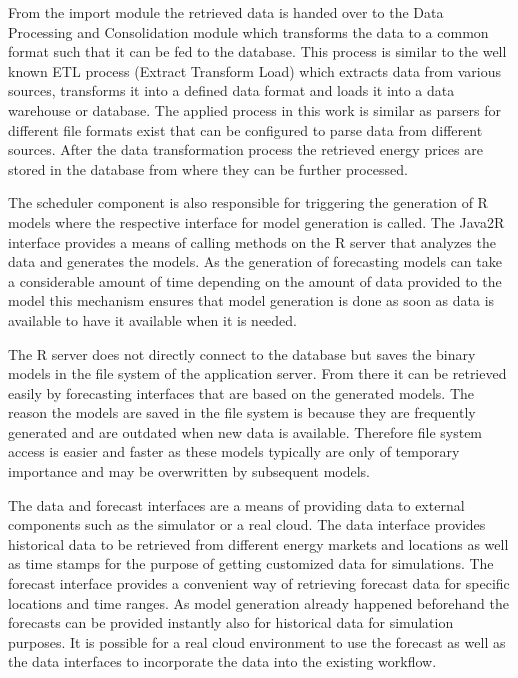 From the import module the retrieved data is handed over to the Data Processing and Consolidation module which transforms the data to a common format such that it can be fed to the database. This process is similar to the well known ETL process (Extract Transform Load) which extracts data from various sources, transforms it into a defined data format and loads it into a data warehouse or database. The applied process in this work is similar as parsers for different file formats exist that can be configured to parse data from different sources. After the data transformation process the retrieved energy prices are stored in the database from where they can be further processed. 

The scheduler component is also responsible for triggering the generation of R models where the respective interface for model generation is called. The Java2R interface provides a means of calling methods on the R server that analyzes the data and generates the models. As the generation of forecasting models can take a considerable amount of time depending on the amount of data provided to the model this mechanism ensures that model generation is done as soon as data is available to have it available when it is needed. 

The R server does not directly connect to the database but saves the binary models in the file system of the application server. From there it can be retrieved easily by forecasting interfaces that are based on the generated models. The reason the models are saved in the file system is because they are frequently generated and are outdated when new data is available. Therefore file system access is easier and faster as these models typically are only of temporary importance and may be overwritten by subsequent models. 

The data and forecast interfaces are a means of providing data to external components such as the simulator or a real cloud. The data interface provides historical data to be retrieved from different energy markets and locations as well as time stamps for the purpose of getting customized data for simulations. The forecast interface provides a convenient way of retrieving forecast data for specific locations and time ranges. As model generation already happened beforehand the forecasts can be provided instantly also for historical data for simulation purposes. It is possible for a real cloud environment to use the forecast as well as the data interfaces to incorporate the data into the existing workflow. 


